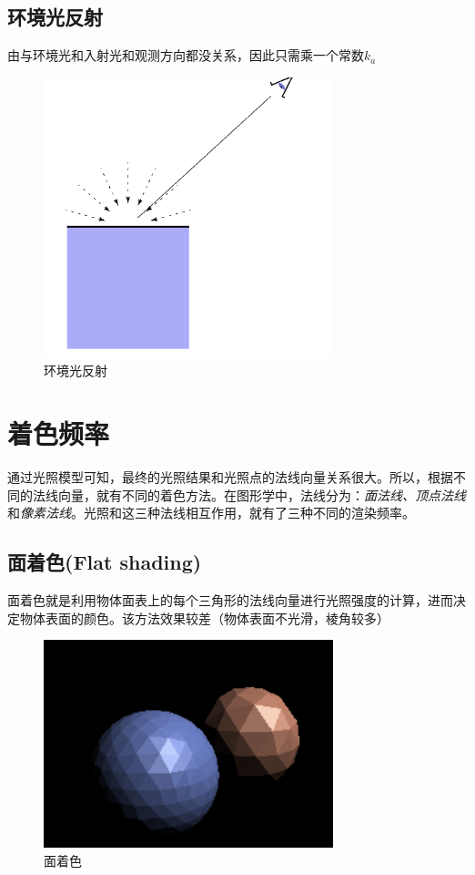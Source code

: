 \subsection*{环境光反射}

由与环境光和入射光和观测方向都没关系，因此只需乘一个常数$k_a$
\begin{figure}[H]
    \centering
    \includegraphics[scale=0.5]{figures/环境光反射.png}
    \caption[short]{环境光反射}
\end{figure}

\section{着色频率}

通过光照模型可知，最终的光照结果和光照点的法线向量关系很大。所以，根据不同的法线向量，就有不同的着色方法。在图形学中，法线分为：\textsl{面法线、顶点法线}和\textsl{像素法线}。光照和这三种法线相互作用，就有了三种不同的渲染频率。

\subsection*{面着色(Flat shading)}

面着色就是利用物体面表上的每个三角形的法线向量进行光照强度的计算，进而决定物体表面的颜色。该方法效果较差（物体表面不光滑，棱角较多）
\begin{figure}[H]
    \centering
    \includegraphics[scale=0.6]{figures/面着色.png}
    \caption[short]{面着色}
\end{figure}
